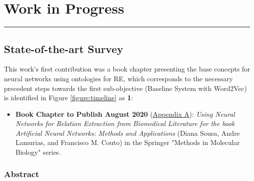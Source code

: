 \hypertarget{4}{}

\chapter{Work in Progress}


\vspace{-1.6cm}

\begingroup
\color{gray}
\par\noindent\rule{\textwidth}{0.4pt}
\endgroup



\section{State-of-the-art Survey}

This work's first contribution was a book chapter presenting the base concepts for neural networks using ontologies for RE, which corresponds to the necessary precedent steps towards the first sub-objective (Baseline System with Word2Vec) is identified in Figure \ref{figure:timeline} as \textbf{1}:

\begin{itemize}
    \item{\textbf{Book Chapter to Publish August 2020} \citep{sousa2019using} (\hyperlink{AA}{Appendix A}): \textit{Using Neural Networks for Relation Extraction from Biomedical Literature for the book Artificial Neural Networks: Methods and Applications} (Diana Sousa, Andre Lamurias, and Francisco M. Couto) in the Springer "Methods in Molecular Biology" series.}
\end{itemize}

\subsection{Abstract}

